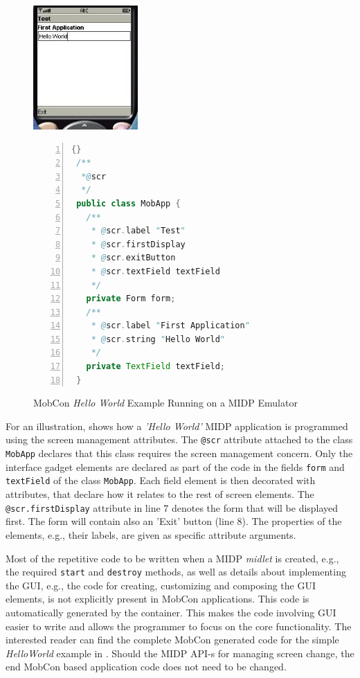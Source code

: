 \begin{figure}[ht]
	\begin{center}
	\begin{minipage}{4cm}
		\includegraphics[width=4cm,height=!]{ch05/hellosc1}
	\end{minipage}\hspace{2cm}%
		\begin{minipage}{6.2cm}
		\begin{scriptsize}
\begin{lstlisting}[numbers=left,language=Java,frame=leftline]{}
 /**
  *@scr
  */
 public class MobApp {
   /**
    * @scr.label "Test"
    * @scr.firstDisplay
    * @scr.exitButton
    * @scr.textField textField
    */
   private Form form;
   /**
    * @scr.label "First Application"  
    * @scr.string "Hello World"
    */
   private TextField textField;
 }
\end{lstlisting}
		\end{scriptsize}
			\end{minipage}
	\end{center}
	\caption{MobCon \textit{Hello World} Example Running on a MIDP Emulator}
	\label{fig:hello}
\end{figure}

For an illustration,  shows how a \textit{'Hello World'} MIDP application is programmed using the screen management attributes. The {\tt @scr} attribute attached to the class {\tt MobApp} declares that this class requires the screen management concern.  Only the interface gadget elements are declared as part of the code in the fields {\tt form} and {\tt textField} of the class {\tt MobApp}. Each field element is then decorated with attributes, that declare how it relates to the rest of screen elements. The {\tt @scr.firstDisplay} attribute in line 7 denotes the form that will be displayed first. The form will contain also an 'Exit' button (line 8). The properties of the elements, e.g., their labels, are given as specific attribute arguments.

Most of the repetitive code to be written when a MIDP \textit{midlet} is created, e.g., the required {\tt start} and {\tt destroy} methods, as well as details about implementing the GUI, e.g., the code for creating, customizing and composing the GUI elements, is not explicitly present in MobCon applications. This code is automatically generated by the container. This makes the code involving GUI easier to write and allows the programmer to focus on the core functionality. The interested reader can find the complete MobCon generated code for the simple \textit{HelloWorld} example in . Should the MIDP API-s for managing screen change, the end MobCon based application code does not need to be changed. 


